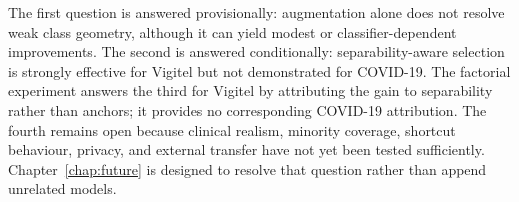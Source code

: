 The first question is answered provisionally: augmentation alone does not resolve weak class geometry, although it can yield modest or classifier-dependent improvements. The second is answered conditionally: separability-aware selection is strongly effective for Vigitel but not demonstrated for COVID-19. The factorial experiment answers the third for Vigitel by attributing the gain to separability rather than anchors; it provides no corresponding COVID-19 attribution. The fourth remains open because clinical realism, minority coverage, shortcut behaviour, privacy, and external transfer have not yet been tested sufficiently. Chapter~\ref{chap:future} is designed to resolve that question rather than append unrelated models.
